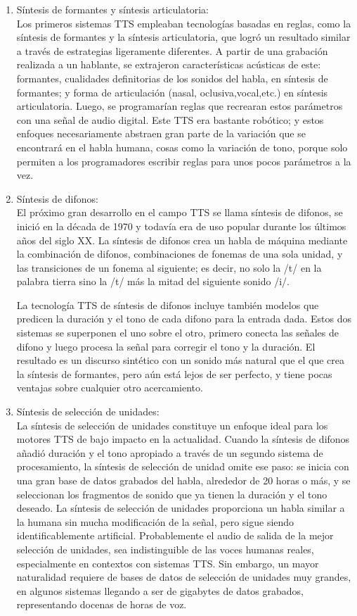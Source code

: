 \begin{enumerate}
	\item  Síntesis de formantes y síntesis articulatoria: \\Los primeros sistemas TTS empleaban tecnologías basadas en reglas, como la síntesis de formantes y la síntesis articulatoria, que logró un resultado similar a través de estrategias ligeramente diferentes. A partir de una grabación realizada a un hablante, se extrajeron características acústicas de este: formantes, cualidades definitorias de los sonidos del habla, en síntesis de formantes; y forma de articulación (nasal, oclusiva,vocal,etc.) en síntesis articulatoria. Luego, se programarían reglas que recrearan estos parámetros con una señal de audio digital. Este TTS era bastante robótico; y estos enfoques necesariamente abstraen gran parte de la variación que se encontrará en el habla humana, cosas como la variación de tono, porque solo permiten a los programadores escribir reglas para unos pocos parámetros a la vez.
	
	\item Síntesis de difonos: \\ El próximo gran desarrollo en el campo TTS se llama síntesis de difonos, se inició en la década de 1970 y todavía era de uso popular durante los últimos años del siglo XX. La síntesis de difonos crea  un habla de máquina mediante la combinación de difonos, combinaciones de fonemas de una sola unidad, y las transiciones de un fonema al siguiente; es decir, no solo la /t/ en la palabra tierra sino la /t/ más la mitad del siguiente sonido /i/. 
	
	La tecnología TTS de síntesis de difonos incluye también modelos que predicen la duración y el tono de cada difono para la entrada dada. Estos dos sistemas se superponen el uno sobre el otro, primero conecta las señales de difono y luego procesa la señal para corregir el tono y la duración. El resultado es un discurso  sintético con un sonido más natural que el que crea la síntesis de formantes, pero aún está lejos de ser perfecto, y tiene pocas ventajas sobre cualquier otro acercamiento. 
	
	\item Síntesis de selección de unidades: \\ La síntesis de selección de unidades constituye un enfoque ideal para los motores TTS de bajo impacto en la actualidad. Cuando la síntesis de difonos añadió duración y el tono apropiado a través de un segundo sistema de procesamiento, la síntesis de selección de unidad omite ese paso: se inicia con una gran base de datos grabados del habla, alrededor de 20 horas o más, y se seleccionan los fragmentos de sonido que ya tienen la duración y el tono deseado. La síntesis de selección de unidades proporciona un habla similar a la humana sin mucha modificación de la señal, pero sigue siendo identificablemente artificial. Probablemente el audio de salida de la mejor selección de unidades, sea indistinguible de las voces humanas reales, especialmente en contextos con sistemas TTS. Sin embargo, un mayor naturalidad requiere de bases de datos de selección de unidades muy grandes, en algunos sistemas llegando a ser de gigabytes de datos grabados, representando docenas de horas de voz. 
	

\end{enumerate}

